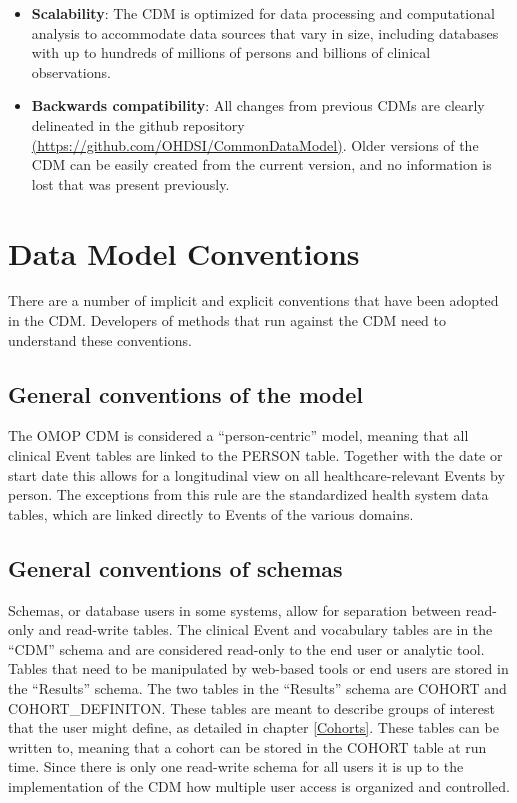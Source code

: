 \documentclass[11pt]{book}
\theoremstyle{definition}
\theoremstyle{definition}
\theoremstyle{definition}
\theoremstyle{remark}
\begin{document}
\begin{itemize}
\item
  \textbf{Scalability}: The CDM is optimized for data processing and computational analysis to accommodate data sources that vary in size, including databases with up to hundreds of millions of persons and billions of clinical observations. 
\item
  \textbf{Backwards compatibility}: All changes from previous CDMs are clearly delineated in the github repository \href{https://github.com/OHDSI/CommonDataModel}{(https://github.com/OHDSI/CommonDataModel)}. Older versions of the CDM can be easily created from the current version, and no information is lost that was present previously. 
\end{itemize}

\hypertarget{data-model-conventions}{%
\section{Data Model Conventions}\label{data-model-conventions}}

There are a number of implicit and explicit conventions that have been adopted in the CDM. Developers of methods that run against the CDM need to understand these conventions. 

\hypertarget{model-conv}{%
\subsection{General conventions of the model}\label{model-conv}}

The OMOP CDM is considered a ``person-centric'' model, meaning that all clinical Event tables are linked to the PERSON table. Together with the date or start date this allows for a longitudinal view on all healthcare-relevant Events by person. The exceptions from this rule are the standardized health system data tables, which are linked directly to Events of the various domains.

\hypertarget{general-conventions-of-schemas}{%
\subsection{General conventions of schemas}\label{general-conventions-of-schemas}}

Schemas, or database users in some systems, allow for separation between read-only and read-write tables. The clinical Event and vocabulary tables are in the ``CDM'' schema and are considered read-only to the end user or analytic tool. Tables that need to be manipulated by web-based tools or end users are stored in the ``Results'' schema. The two tables in the ``Results'' schema are COHORT and COHORT\_DEFINITON. These tables are meant to describe groups of interest that the user might define, as detailed in chapter \ref{Cohorts}. These tables can be written to, meaning that a cohort can be stored in the COHORT table at run time. Since there is only one read-write schema for all users it is up to the implementation of the CDM how multiple user access is organized and controlled.
\end{document}
